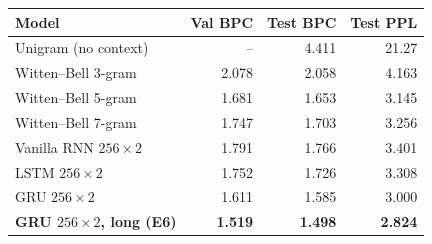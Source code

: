 \footnotesize
\begin{tabular}{lrrr}
\toprule
Model & Val BPC & Test BPC & Test PPL \\
\midrule
Unigram (no context) & -- & 4.411 & 21.27 \\
Witten--Bell 3-gram & 2.078 & 2.058 & 4.163 \\
Witten--Bell 5-gram & 1.681 & 1.653 & 3.145 \\
Witten--Bell 7-gram & 1.747 & 1.703 & 3.256 \\
Vanilla RNN $256\times2$ & 1.791 & 1.766 & 3.401 \\
LSTM $256\times2$ & 1.752 & 1.726 & 3.308 \\
GRU $256\times2$ & 1.611 & 1.585 & 3.000 \\
\textbf{GRU $256\times2$, long (E6)} & \textbf{1.519} & \textbf{1.498} & \textbf{2.824} \\
\bottomrule
\end{tabular}
